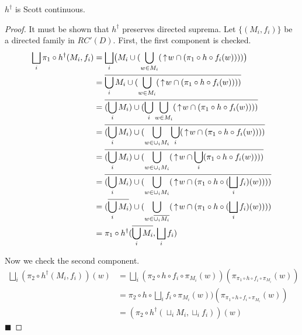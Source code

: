 \begin{theorem}
$h^{\dagger}$ is Scott continuous.
\end{theorem}
\begin{proof}
It must be shown that $h^{\dagger}$ preserves directed suprema.  Let $\{(M_i,f_i)\}$ be a directed family in $RC'(D)$.  First, the first component is checked.
\begin{align*}
\bigsqcup_i \pi_1 \circ h^{\dagger}(M_i,f_i) &= 
\bigsqcup_i \bigl(M_i \cup (\bigcup_{w\in M_i} (\,\uparrow\! w \cap (\pi_1 \circ h\circ f_i(w))))\bigr) \\
&= \overline{\bigcup_i M_i \cup (\bigcup_{w\in M_i} (\,\uparrow\! w \cap (\pi_1 \circ h\circ f_i(w))))} \\
&= \overline{(\bigcup_i M_i) \cup (\bigcup_i \bigcup_{w\in M_i} (\,\uparrow\! w \cap (\pi_1 \circ h \circ f_i(w))))} \\
&= \overline{(\bigcup_i M_i) \cup (\bigcup_{w\in \cup_i M_i} \bigcup_i (\,\uparrow\! w \cap (\pi_1 \circ h \circ f_i(w))))} \\
&= \overline{(\bigcup_i M_i) \cup (\bigcup_{w\in \cup_i M_i} (\,\uparrow\! w \cap \bigcup_i (\pi_1 \circ h \circ f_i(w))))} \\
&= \overline{(\bigcup_i M_i) \cup (\bigcup_{w\in \cup_i M_i} (\,\uparrow\! w \cap (\pi_1 \circ h \circ (\bigsqcup_i f_i)(w))))} \\
&= (\overline{\bigcup_i M_i}) \cup (\bigcup_{w\in \overline{\cup_i M_i}} (\,\uparrow\! w \cap (\pi_1 \circ h \circ (\bigsqcup_i f_i)(w)))) \\
&= \pi_1\circ h^{\dagger}(\overline{\bigcup_i M_i}, \bigsqcup_i f_i)
\end{align*}

Now we check the second component.
\begin{align*}
\bigsqcup_i (\pi_2\circ h^{\dagger}(M_i,f_i))(w) 
&= \bigsqcup_i (\pi_2\circ h\circ f_i\circ \pi_{M_i}(w))(\pi_{\pi_1\circ h\circ f_i \circ \pi_{M_i}}(w)) \\
&=  \pi_2\circ h\circ \bigsqcup_i f_i\circ \pi_{M_i}(w))(\pi_{\pi_1\circ h\circ f_i \circ \pi_{M_i}}(w)) \\
&= (\pi_2\circ h^{\dagger}(\sqcup_i M_i, \sqcup_i f_i))(w)
\end{align*}
\hfill $\blacksquare$
\end{proof}

